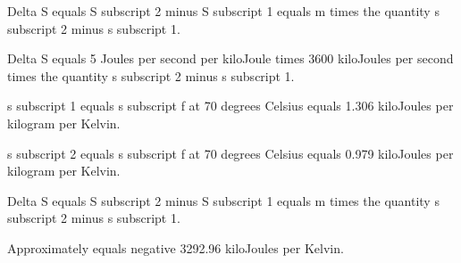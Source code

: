 Delta S equals S subscript 2 minus S subscript 1 equals m times the quantity s subscript 2 minus s subscript 1.

Delta S equals 5 Joules per second per kiloJoule times 3600 kiloJoules per second times the quantity s subscript 2 minus s subscript 1.

s subscript 1 equals s subscript f at 70 degrees Celsius equals 1.306 kiloJoules per kilogram per Kelvin.

s subscript 2 equals s subscript f at 70 degrees Celsius equals 0.979 kiloJoules per kilogram per Kelvin.

Delta S equals S subscript 2 minus S subscript 1 equals m times the quantity s subscript 2 minus s subscript 1.

Approximately equals negative 3292.96 kiloJoules per Kelvin.